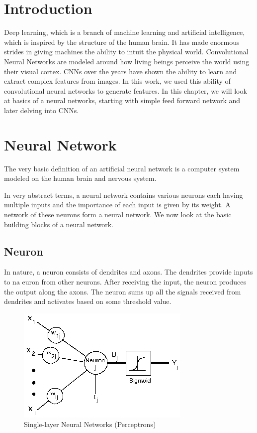 \doublespacing
{} 
\label{chap:CNN}
\section{Introduction}
Deep learning, which is a branch of machine learning and artificial intelligence, which is  inspired by the structure of the human brain. It  has made enormous strides in giving machines the ability to intuit the physical world. Convolutional Neural Networks are modeled around how living beings perceive the world using their visual cortex. CNNs over the years have shown the ability to learn and extract complex features from images. In this work, we used this ability of convolutional neural networks to generate features. In this chapter, we will look at basics of a neural networks, starting with simple feed forward network and later delving into CNNs.


\section{Neural Network}

The very basic definition of an artificial neural network is a computer system modeled on the human brain and nervous system.
\par
In very abstract terms, a neural network contains various neurons each having multiple inputs and the importance of each input is given by its weight. A network of these neurons form a neural network. We now look at the basic building blocks of a neural network.

\subsection{Neuron}
In nature, a neuron consists of dendrites and  axons. The dendrites provide inputs to na euron from other neurons. After receiving the input, the neuron produces the output along the axons. The neuron sums up all the signals received from dendrites and activates based on some threshold value. 

\begin{figure}[H]
  \centering
    \includegraphics[scale=.3, angle=0]{Files/nn2.png}
    \caption[Single-layer Neural Networks (Perceptrons)]{Single-layer Neural Networks (Perceptrons)}
    \label{fig:NNNN}
\end{figure}


